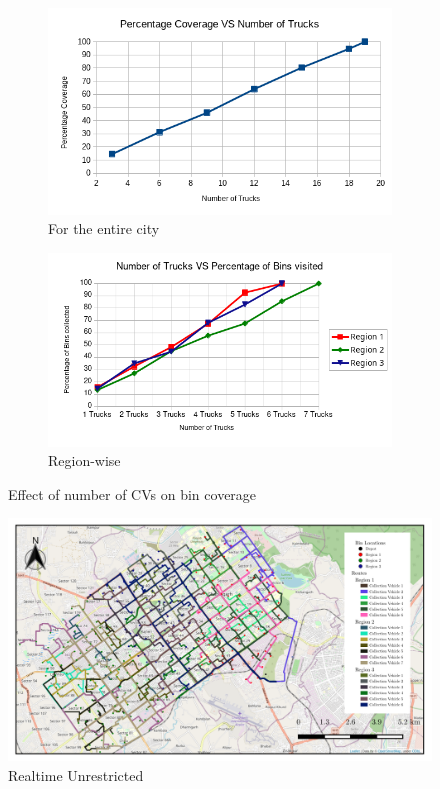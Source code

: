 \documentclass[12pt]{article}
\begin{document}
\begin{figure}[H]
    \centering
    \begin{subfigure}{0.5\textwidth}
        \centering
        \includegraphics[width=\linewidth]{coverage_VS_number_of_trucks.png}
        \caption{For the entire city}\label{figc1}
    \end{subfigure}%
    \begin{subfigure}{0.5\textwidth}
        \centering
        \includegraphics[width=\linewidth]{number_of_trucks_VS_bins_visited.png}
        \caption{Region-wise}\label{figc2}
    \end{subfigure}
    \caption{Effect of number of CVs on bin coverage}
    \label{fig3}
\end{figure}

 
\begin{figure}[H]
    \centering
    \includegraphics[scale=1.4]{Dynamic_weighted_unrestricted.png} %
    \caption{Realtime Unrestricted}\label{fig2}
\end{figure}
\end{document}
